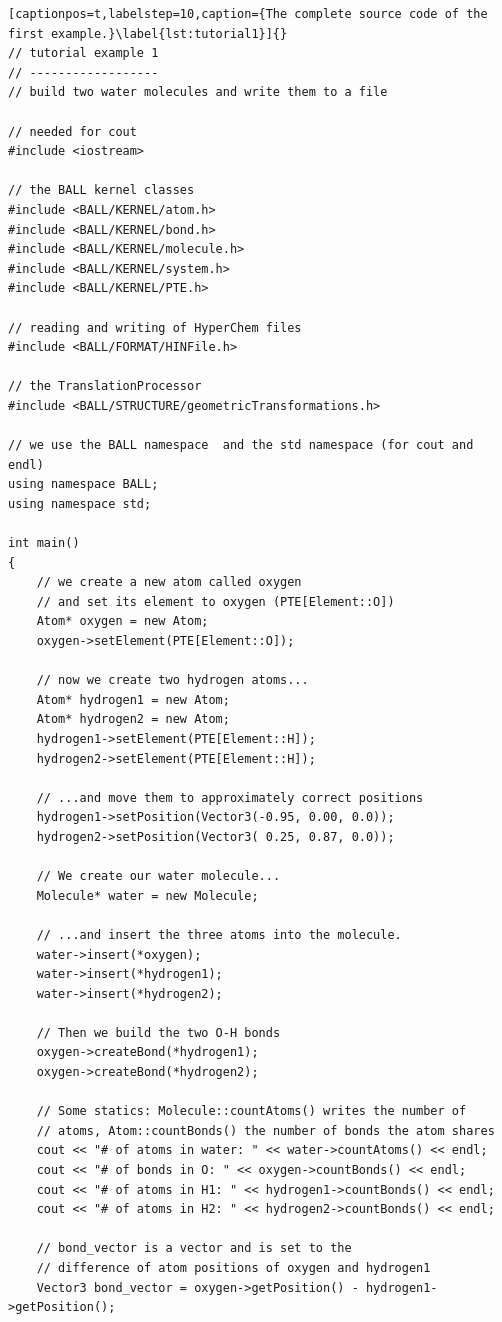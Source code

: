 \newpage
\begin{lstlisting}[captionpos=t,labelstep=10,caption={The complete source code of the first example.}\label{lst:tutorial1}]{}
// tutorial example 1
// ------------------
// build two water molecules and write them to a file

// needed for cout
#include <iostream>

// the BALL kernel classes
#include <BALL/KERNEL/atom.h>
#include <BALL/KERNEL/bond.h>
#include <BALL/KERNEL/molecule.h>
#include <BALL/KERNEL/system.h>
#include <BALL/KERNEL/PTE.h>

// reading and writing of HyperChem files
#include <BALL/FORMAT/HINFile.h>

// the TranslationProcessor
#include <BALL/STRUCTURE/geometricTransformations.h>

// we use the BALL namespace  and the std namespace (for cout and endl)
using namespace BALL;
using namespace std;

int main()
{
	// we create a new atom called oxygen
	// and set its element to oxygen (PTE[Element::O])
	Atom* oxygen = new Atom;
	oxygen->setElement(PTE[Element::O]);

	// now we create two hydrogen atoms...
	Atom* hydrogen1 = new Atom;
	Atom* hydrogen2 = new Atom;
	hydrogen1->setElement(PTE[Element::H]);
	hydrogen2->setElement(PTE[Element::H]);

	// ...and move them to approximately correct positions
 	hydrogen1->setPosition(Vector3(-0.95, 0.00, 0.0));
 	hydrogen2->setPosition(Vector3( 0.25, 0.87, 0.0));

	// We create our water molecule...
	Molecule* water = new Molecule;

	// ...and insert the three atoms into the molecule.
	water->insert(*oxygen);
	water->insert(*hydrogen1);
	water->insert(*hydrogen2);

	// Then we build the two O-H bonds
	oxygen->createBond(*hydrogen1);
	oxygen->createBond(*hydrogen2);

	// Some statics: Molecule::countAtoms() writes the number of
	// atoms, Atom::countBonds() the number of bonds the atom shares
	cout << "# of atoms in water: " << water->countAtoms() << endl;
	cout << "# of bonds in O: " << oxygen->countBonds() << endl;
	cout << "# of atoms in H1: " << hydrogen1->countBonds() << endl;
	cout << "# of atoms in H2: " << hydrogen2->countBonds() << endl;

	// bond_vector is a vector and is set to the
	// difference of atom positions of oxygen and hydrogen1
	Vector3 bond_vector = oxygen->getPosition() - hydrogen1->getPosition();


\end{lstlisting}
